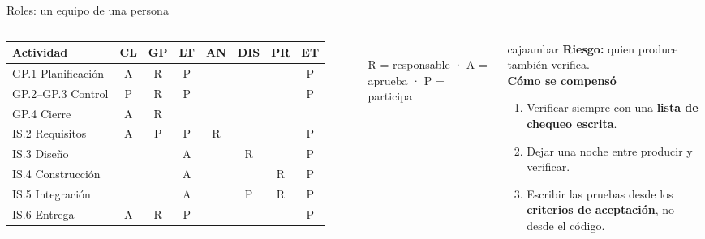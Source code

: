 \documentclass[aspectratio=169,11pt]{beamer}
\newcommand{\caja}[3]{\begin{beamercolorbox}[wd=\dimexpr\linewidth-12pt\relax,sep=6pt,rounded=true]{#1}#3\end{beamercolorbox}}
\begin{document}
\begin{frame}{Roles: un equipo de una persona}
\begin{columns}[T,onlytextwidth]
\scriptsize\setlength{\tabcolsep}{3.5pt}
\begin{tabular}{@{}l c c c c c c c@{}}
\toprule
\textbf{Actividad} & \textbf{CL} & \textbf{GP} & \textbf{LT} & \textbf{AN} & \textbf{DIS} & \textbf{PR} & \textbf{ET} \\
\midrule
GP.1 Planificación & A & R & P & & & & P \\
GP.2–GP.3 Control  & P & R & P & & & & P \\
GP.4 Cierre        & A & R & & & & & \\
IS.2 Requisitos    & A & P & P & R & & & P \\
IS.3 Diseño        & & & A & & R & & P \\
IS.4 Construcción  & & & A & & & R & P \\
IS.5 Integración   & & & A & & P & R & P \\
IS.6 Entrega       & A & R & P & & & & P \\
\bottomrule
\end{tabular}\\[0.1cm]
{\scriptsize R = responsable · A = aprueba · P = participa}
\caja{cajaambar}{}{\small
\textbf{Riesgo:} quien produce también verifica.\\[0.15cm]
\textbf{Cómo se compensó}
\begin{enumerate}\footnotesize
  \item Verificar siempre con una \textbf{lista de chequeo escrita}.
  \item Dejar una noche entre producir y verificar.
  \item Escribir las pruebas desde los \textbf{criterios de aceptación}, no desde el código.
\end{enumerate}}
\end{columns}
\end{frame}
\end{document}
